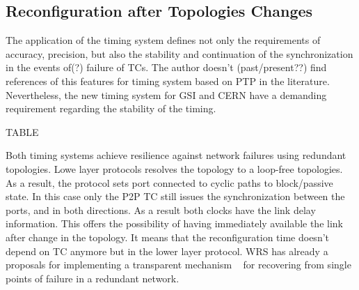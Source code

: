 \FloatBarrier

\subsection{Reconfiguration after Topologies Changes}

The application of the timing system defines not only the requirements of accuracy, precision, 
but also the stability and continuation of the synchronization in the events
of(?) failure of TCs. The author doesn't (past/present??)
find references of this features for timing system based on PTP in the
literature. Nevertheless, the new timing system for GSI and CERN  have a demanding requirement
regarding the stability of the timing. 

TABLE

Both timing systems achieve resilience against network failures using redundant
topologies. Lowe layer protocols resolves the topology to a loop-free topologies. As
a result, the protocol sets port connected to cyclic paths to block/passive
state. In this case only the P2P TC still issues the synchronization between the
ports, and in both directions. As a result both clocks have the link delay
information. This offers the possibility of having immediately available the
link after change in the topology. It means that the reconfiguration time 
doesn't depend on TC anymore but in the  lower layer protocol. WRS has already a
proposals for implementing a transparent mechanism ~\cite{biblio:wrswitch} for
recovering from single points of failure in a redundant network.
